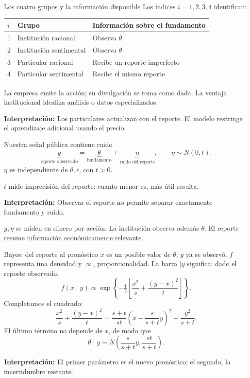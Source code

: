 \documentclass[aspectratio=169,11pt]{beamer}
\newcommand{\idea}[1]{\par\medskip\textbf{Interpretación:} #1}
\begin{document}
\begin{frame}{Los cuatro grupos y la información disponible}
Los índices \(i=1,2,3,4\) identifican:
\begin{center}
\begin{tabular}{lll}
\toprule
\(i\) & Grupo & Información sobre el fundamento\\
\midrule
1 & Institución racional & Observa \(\theta\)\\
2 & Institución sentimental & Observa \(\theta\)\\
3 & Particular racional & Recibe un reporte imperfecto\\
4 & Particular sentimental & Recibe el mismo reporte\\
\bottomrule
\end{tabular}
\end{center}
\small
La empresa emite la acción; su divulgación se toma como dada.
La ventaja institucional idealiza análisis o datos especializados.
\idea{Los particulares actualizan con el reporte. El modelo restringe
el aprendizaje adicional usando el precio.}
\end{frame}

\begin{frame}{Nuestra señal pública contiene ruido}
\[
 \underbrace{y}_{\text{reporte observado}}
 =\underbrace{\theta}_{\text{fundamento}}
 +\underbrace{\eta}_{\text{ruido del reporte}},
 \qquad \eta\sim N(0,t).
\]
\(\eta\) es independiente de \(\theta,\epsilon\), con \(t>0\).
\medskip\par
\(t\) mide imprecisión del reporte: cuanto menor es, más útil resulta.
\idea{Observar el reporte no permite separar exactamente fundamento y ruido.}
\small\medskip\par
\(y,\eta\) se miden en dinero por acción. La institución observa además
\(\theta\). El reporte resume información económicamente relevante.
\end{frame}

\begin{frame}{Bayes: del reporte al pronóstico}
\small
\(x\) es un posible valor de \(\theta\); \(y\) ya se observó.
\(f\) representa una densidad y \(\propto\), proporcionalidad.
La barra \(\mid y\) significa: dado el reporte observado.
\[
f(x\mid y)\propto
\exp\left\{-\tfrac12\left[\frac{x^2}{s}+\frac{(y-x)^2}{t}\right]\right\}.
\]
Completamos el cuadrado:
\[
\frac{x^2}{s}+\frac{(y-x)^2}{t}
=\frac{s+t}{st}\left(x-\frac{s}{s+t}y\right)^2+\frac{y^2}{s+t}.
\]
El último término no depende de \(x\), de modo que
\[
\theta\mid y\sim N\left(\frac{s}{s+t}y,\frac{st}{s+t}\right).
\]
\normalsize
\idea{El primer parámetro es el nuevo pronóstico; el segundo, la incertidumbre restante.}
\end{frame}
\end{document}
